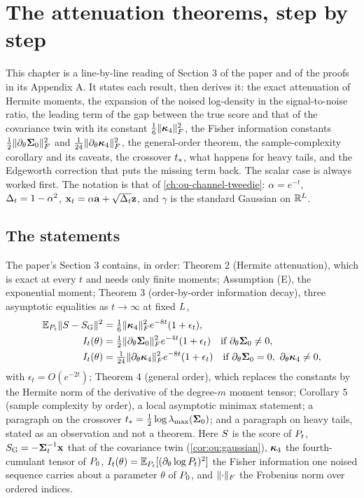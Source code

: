 \chapter{The attenuation theorems, step by step}
\label{ch:attenuation-theorems}

This chapter is a line-by-line reading of Section 3 of the paper and of the proofs in
its Appendix A. It states each result, then derives it: the exact attenuation of
Hermite moments, the expansion of the noised log-density in the signal-to-noise ratio,
the leading term of the gap between the true score and that of the covariance twin
with its constant $\tfrac16\lVert \bm{\kappa}_4 \rVert_{F}^2$, the Fisher information constants
$\tfrac12\lVert \partial_\theta\mathbf{\Sigma}_0 \rVert_{F}^2$ and $\tfrac1{24}\lVert \partial_\theta\bm{\kappa}_4 \rVert_{F}^2$,
the general-order theorem, the sample-complexity corollary and its caveats, the
crossover $t_{*}$, what happens for heavy tails, and the Edgeworth correction that
puts the missing term back. The scalar case is always worked first. The notation is
that of \cref{ch:ou-channel-tweedie}: $\alpha=e^{-t}$, $\Delta_t=1-\alpha^2$,
$\mathbf{x}_t=\alpha\mathbf{a}+\sqrt{\Delta_t}\mathbf{z}$, and $\gamma$ is the standard Gaussian on
$\mathbb{R}^{L}$.

\section{The statements}
\label{sec:att:statements}

The paper's Section 3 contains, in order: Theorem 2 (Hermite attenuation), which is
exact at every $t$ and needs only finite moments; Assumption (E), the exponential
moment; Theorem 3 (order-by-order information decay), three asymptotic equalities as
$t\to\infty$ at fixed $L$,
\begin{align}
  \mathbb{E}_{P_t}\lVert S-S_{\mathrm{G}}\rVert^2&=\tfrac16\lVert \bm{\kappa}_4 \rVert_{F}^2e^{-8t}(1+\epsilon_t),
  \label{eq:att:scoregap}\\
  I_t(\theta)&=\tfrac12\lVert \partial_\theta\mathbf{\Sigma}_0 \rVert_{F}^2e^{-4t}(1+\epsilon_t)
  \quad\text{if }\partial_\theta\mathbf{\Sigma}_0\ne0,
  \label{eq:att:info2}\\
  I_t(\theta)&=\tfrac1{24}\lVert \partial_\theta\bm{\kappa}_4 \rVert_{F}^2e^{-8t}(1+\epsilon_t)
  \quad\text{if }\partial_\theta\mathbf{\Sigma}_0=0,\ \partial_\theta\bm{\kappa}_4\ne0,
  \label{eq:att:info4}
\end{align}
with $\epsilon_t=O(e^{-2t})$; Theorem 4 (general order), which replaces the
constants by the Hermite norm of the derivative of the degree-$m$ moment tensor;
Corollary 5 (sample complexity by order), a local asymptotic minimax statement; a
paragraph on the crossover $t_{*}=\tfrac12\log\lambda_{\max}(\mathbf{\Sigma}_0)$; and a paragraph on
heavy tails, stated as an observation and not a theorem. Here $S$ is the score of
$P_t$, $S_{\mathrm{G}}=-\mathbf{\Sigma}_t^{-1}\mathbf{x}$ that of the covariance twin
(\cref{cor:ou:gaussian}), $\bm{\kappa}_4$ the fourth-cumulant tensor of $P_0$,
$I_t(\theta)=\mathbb{E}_{P_t}[(\partial_\theta\log P_t)^2]$ the Fisher information one noised
sequence carries about a parameter $\theta$ of $P_0$, and $\lVert \cdot \rVert_{F}$ the Frobenius
norm over ordered indices.

